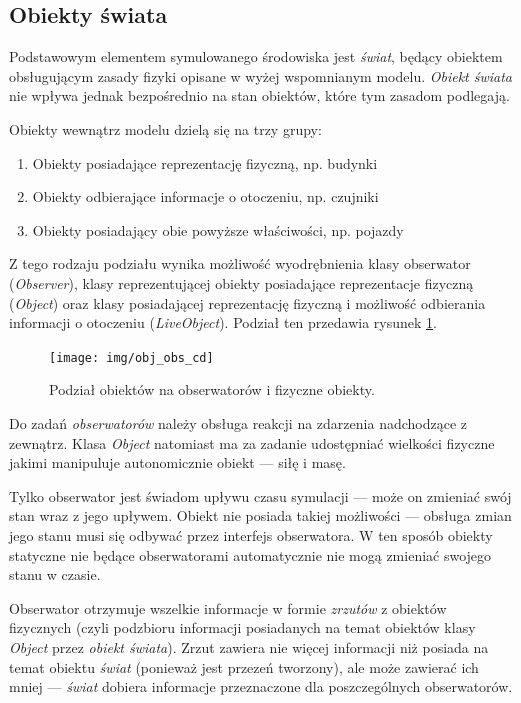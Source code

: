 {{\subsection{Obiekty świata}
\par{
Podstawowym elementem symulowanego środowiska jest \textit{świat}, będący obiektem obsługującym zasady fizyki opisane w wyżej wspomnianym modelu. \textit{Obiekt świata} nie wpływa jednak bezpośrednio na stan obiektów, które tym zasadom podlegają.
}
\par{
Obiekty wewnątrz modelu dzielą się na trzy grupy:
\begin{enumerate}
\item Obiekty posiadające reprezentację fizyczną, np. budynki
\item Obiekty odbierające informacje o otoczeniu, np. czujniki
\item Obiekty posiadający obie powyższe właściwości, np. pojazdy
\end{enumerate}
Z tego rodzaju podziału wynika możliwość wyodrębnienia klasy obserwator (\textit{Observer}), klasy reprezentującej obiekty posiadające reprezentacje fizyczną (\textit{Object}) oraz klasy posiadającej reprezentację fizyczną i możliwość odbierania informacji o otoczeniu (\textit{LiveObject}). Podział ten przedawia rysunek \ref{obj_obs_cd}.
\begin{figure}[!ht]
    \begin{center}
	\texttt{[image: img/obj\_obs\_cd]}
	\caption{Podział obiektów na obserwatorów i fizyczne obiekty.}
	\label{obj_obs_cd}
    \end{center}
\end{figure}
}
\par{
Do zadań \textit{obserwatorów} należy obsługa reakcji na zdarzenia nadchodzące z zewnątrz. Klasa \textit{Object} natomiast ma za zadanie udostępniać wielkości fizyczne jakimi manipuluje autonomicznie obiekt --- siłę i masę.
}
\par{
Tylko obserwator jest świadom upływu czasu symulacji --- może on zmieniać swój stan wraz z jego upływem. Obiekt nie posiada takiej możliwości --- obsługa zmian jego stanu musi się odbywać przez interfejs obserwatora. W ten sposób obiekty statyczne nie będące obserwatorami automatycznie nie mogą zmieniać swojego stanu w czasie.
}
\par{
Obserwator otrzymuje wszelkie informacje w formie \textit{zrzutów} z obiektów fizycznych (czyli podzbioru informacji posiadanych na temat obiektów klasy \textit{Object} przez \textit{obiekt świata}). Zrzut zawiera nie więcej informacji niż posiada na temat obiektu \textit{świat} (ponieważ jest przezeń tworzony), ale może zawierać ich mniej --- \textit{świat} dobiera informacje przeznaczone dla poszczególnych obserwatorów.
}

}}
